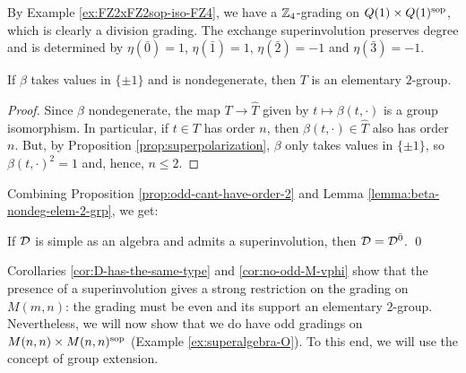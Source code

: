 \begin{ex}\label{ex:FZ4-revisited}
    By Example \ref{ex:FZ2xFZ2sop-iso-FZ4}, we have a $\mathbb{Z}_4$-grading on $Q(1)\times Q(1)^{\mathrm{sop}}$, which is clearly a division grading. 
    The exchange superinvolution preserves degree and is determined by $\eta (\bar 0) = 1$, $\eta (\bar 1) = 1$, $\eta (\bar 2) = -1$ and $\eta (\bar 3) = -1$.
\end{ex}

\begin{lemma}\label{lemma:beta-nondeg-elem-2-grp}
    If $\beta$ takes values in $\{ \pm 1 \}$ and is nondegenerate, then $T$ is an elementary $2$-group.
\end{lemma}

\begin{proof}
    Since $\beta$ nondegenerate, the map $T \to \widehat T$ given by $t \mapsto \beta(t, \cdot)$ is a group isomorphism.
    In particular, if $t\in T$ has order $n$, then $\beta(t, \cdot)\in \widehat T$ also has order $n$.
    But, by Proposition \ref{prop:superpolarization}, $\beta$ only takes values in $\{ \pm 1\}$, so  $\beta(t, \cdot )^2 =1$ and, hence, $ n \leq 2$.
\end{proof}

Combining Proposition \ref{prop:odd-cant-have-order-2} and Lemma \ref{lemma:beta-nondeg-elem-2-grp}, we get:

\begin{cor}\label{cor:no-odd-M-vphi}
    If $\mathcal{D}$ is simple as an algebra and admits a superinvolution, then $\mathcal{D} = \mathcal{D}^{\bar0}$. \qed
\end{cor}


Corollaries \ref{cor:D-has-the-same-type} and \ref{cor:no-odd-M-vphi} show that the presence of a superinvolution gives a strong restriction on the grading on $M(m,n)$: the grading must be even and its support an elementary $2$-group. 
Nevertheless, we will now show that we do have odd gradings on $M(n,n)\times M(n,n)^{\mathrm{sop}}$ (Example \ref{ex:superalgebra-O}). 
To this end, we will use the concept of group extension.

